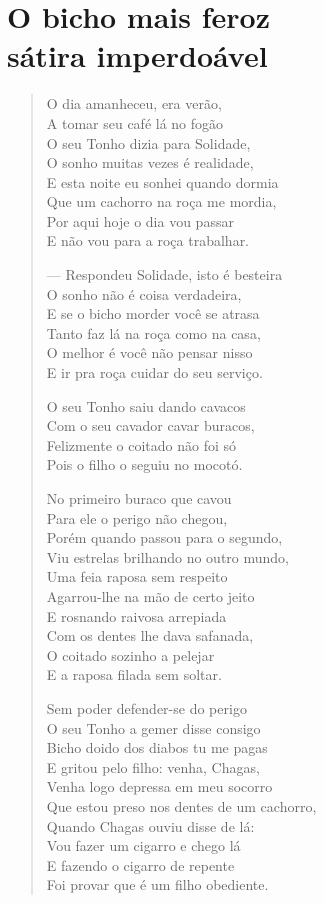 \chapter[O bicho mais feroz sátira imperdoável]{O bicho mais feroz\\ sátira imperdoável}

\begin{verse}
O dia amanheceu, era verão,\\
A tomar seu café lá no fogão\\
O seu Tonho dizia para Solidade,\\
O sonho muitas vezes é realidade,\\
E esta noite eu sonhei quando dormia\\
Que um cachorro na roça me mordia,\\
Por aqui hoje o dia vou passar\\
E não vou para a roça trabalhar.

--- Respondeu Solidade, isto é besteira\\
O sonho não é coisa verdadeira,\\
E se o bicho morder você se atrasa\\
Tanto faz lá na roça como na casa,\\
O melhor é você não pensar nisso\\
E ir pra roça cuidar do seu serviço.

O seu Tonho saiu dando cavacos\\
Com o seu cavador cavar buracos,\\
Felizmente o coitado não foi só\\
Pois o filho o seguiu no mocotó.

No primeiro buraco que cavou\\
Para ele o perigo não chegou,\\
Porém quando passou para o segundo,\\
Viu estrelas brilhando no outro mundo,\\
Uma feia raposa sem respeito\\
Agarrou-lhe na mão de certo jeito\\
E rosnando raivosa arrepiada\\
Com os dentes lhe dava safanada,\\
O coitado sozinho a pelejar\\
E a raposa filada sem soltar.

Sem poder defender-se do perigo\\
O seu Tonho a gemer disse consigo\\
Bicho doido dos diabos tu me pagas\\
E gritou pelo filho: venha, Chagas,\\
Venha logo depressa em meu socorro\\
Que estou preso nos dentes de um cachorro,\\
Quando Chagas ouviu disse de lá:\\
Vou fazer um cigarro e chego lá\\
E fazendo o cigarro de repente\\
Foi provar que é um filho obediente.


\end{verse}
